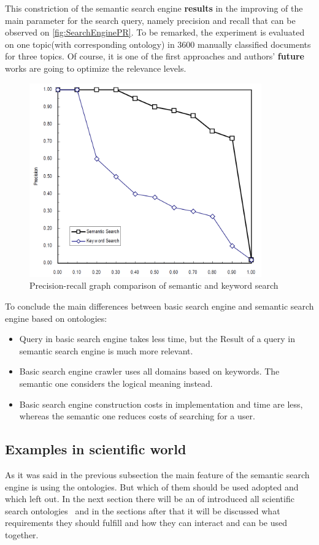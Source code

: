		This constriction of the semantic search engine \textbf{results} in the improving of the main parameter for the search query, namely precision and recall that can be observed on \autoref{fig:SearchEnginePR}. To be remarked, the experiment is evaluated on one topic(with corresponding ontology) in  3600 manually classified documents for three topics. Of course, it is one of the first approaches and authors' \textbf{future} works are going to optimize the relevance levels.
		\begin{figure}
			\centering
			\includegraphics[width=10cm]{images/SearchEnginePR.PNG}
			\caption{Precision-recall graph comparison of semantic and keyword search\cite[p. 1918]{Fang05}}
			\label{fig:SearchEnginePR}
		\end{figure}
		To conclude the main differences between basic search engine and semantic search engine based on ontologies\cite[p.653]{Gup12}:
			\begin{itemize}
				\item Query in basic search engine takes less time, but the  Result of a query in semantic search engine is much more relevant.
				\item Basic search engine crawler uses all domains based on keywords. The semantic one considers the logical meaning instead. 
				\item Basic search engine construction costs in implementation and time are less, whereas the semantic one reduces costs of searching for a user.   
			\end{itemize} 
		\subsection{Examples in scientific world}
		As it was said in the previous subsection the main feature of the semantic search engine is using the ontologies. But which of them should be used adopted and which left out. In the next section there will be an of introduced all scientific search ontologies \frqq \ and in the sections after that it will be discussed what requirements they should fulfill and how they can interact and can be used together.
		
